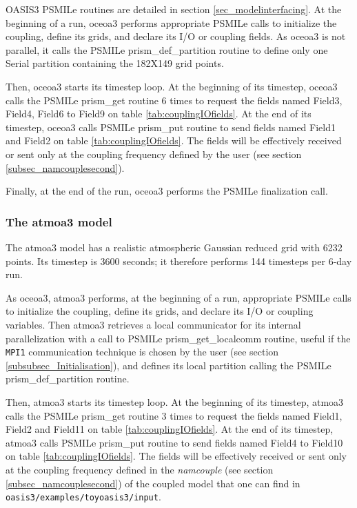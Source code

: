 OASIS3 PSMILe routines are detailed in
section \ref{sec_modelinterfacing}. At the beginning of a run, oceoa3
performs appropriate PSMILe calls to initialize the coupling, define
its grids, and declare its I/O or coupling fields. As oceoa3 is not
parallel, it calls the PSMILe prism\_def\_partition routine to
define only one Serial partition containing the 182X149 grid points.

Then, oceoa3 starts its timestep loop. At the beginning of its
timestep, oceoa3 calls the PSMILe prism\_get routine 6 times to
request the fields named Field3, Field4, Field6 to Field9 on table
\ref{tab:couplingIOfields}. At the end of its timestep, oceoa3 calls
PSMILe prism\_put routine to send fields named Field1 and Field2 on
table \ref{tab:couplingIOfields}. The fields will be effectively
received or sent only at the coupling frequency defined by the user
(see section \ref{subsec_namcouplesecond}).


Finally, at the end of the run, oceoa3 performs the PSMILe finalization call. 

\subsubsection{The atmoa3 model}
\label{sec:atmoa3} 

The atmoa3 model has a realistic atmospheric Gaussian reduced
grid with 6232 points. Its timestep is 3600 seconds; it therefore performs 144
timesteps per 6-day run.

As oceoa3, atmoa3 performs, at the beginning of a run, appropriate
PSMILe calls to initialize the coupling, define its grids, and declare
its I/O or coupling variables. Then atmoa3 retrieves a local
communicator for its internal parallelization with a call to PSMILe
prism\_get\_localcomm routine, useful if the {\tt MPI1} communication
technique is chosen by the user (see section
\ref{subsubsec_Initialisation}), and defines its local
partition calling the PSMILe
prism\_def\_partition routine.


Then, atmoa3 starts its timestep loop. At the beginning of its timestep,
atmoa3 calls the PSMILe prism\_get routine 3 times to request the fields
named Field1, Field2 and Field11 on table
\ref{tab:couplingIOfields}. At the end of its timestep, atmoa3 calls
PSMILe prism\_put routine to send  fields named Field4 to Field10 on
table \ref{tab:couplingIOfields}. The fields will be effectively
received or sent only at the coupling frequency defined in the {\it namcouple}
(see section \ref{subsec_namcouplesecond}) of the coupled model that one can
find in {\tt oasis3/examples/toyoasis3/input}. 

